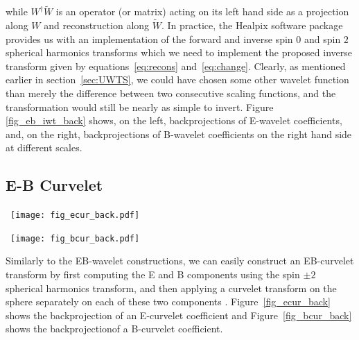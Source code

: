 while $W^\dagger \tilde{W}$ is an operator (or matrix) acting on its left hand side as a projection along $W$ and reconstruction 
along $\tilde{W}$. In practice, the Healpix software package provides us with an implementation of the forward and inverse spin $0$ and 
spin $2$ spherical harmonics transforms which we need to implement the proposed inverse transform given by equations~\eqref{eq:recons} 
and~\eqref{eq:change}. Clearly, as mentioned earlier in section~\ref{sec:UWTS}, we could have chosen some other wavelet function than merely 
the difference between two consecutive scaling functions, and the transformation would still be nearly as simple to invert. Figure \ref{fig_eb_iwt_back} 
shows, on the left, backprojections of E-wavelet coefficients, and, on the right, backprojections of B-wavelet coefficients on the right hand side at different scales.

\subsection*{E-B  Curvelet}
\begin{figure*}[htb]
\centerline{
\vbox{
 \hbox{
 \texttt{[image: fig\_ecur\_back.pdf]}
 }
  }
 }
\caption{E-curvelet coefficient backprojection.}
\label{fig_ecur_back}
\end{figure*}

\begin{figure*}[htb]
\centerline{
\vbox{
 \hbox{
 \texttt{[image: fig\_bcur\_back.pdf]}
 }
 }
 }
\caption{B-curvelet coefficient backprojection.}
\label{fig_bcur_back}
\end{figure*}
Similarly to the EB-wavelet constructions, we can easily construct an EB-curvelet transform by first computing the E and B components using 
the spin $\pm 2$ spherical harmonics transform, and then applying a curvelet transform on the sphere separately on each of these two components  \citet{starck:pola09}.
Figure~\ref{fig_ecur_back} shows the backprojection of an E-curvelet coefficient and Figure~\ref{fig_bcur_back} shows the backprojectionof a B-curvelet coefficient.



